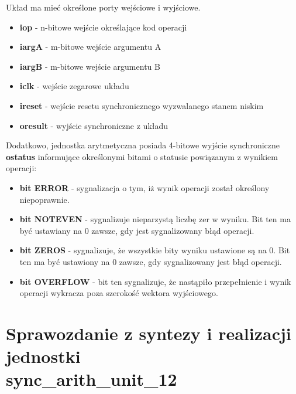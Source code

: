 \documentclass[12pt]{article}
\begin{document}
Układ ma mieć określone porty wejściowe i wyjściowe.
\begin{itemize}
  \item \textbf{i\textunderscore op} - n-bitowe wejście określające kod operacji
  \item \textbf{i\textunderscore arg\textunderscore A} - m-bitowe wejście argumentu A
  \item \textbf{i\textunderscore arg\textunderscore B} - m-bitowe wejście argumentu B
  \item \textbf{i\textunderscore clk} - wejście zegarowe układu
  \item \textbf{i\textunderscore reset} - wejście resetu synchronicznego wyzwalanego stanem niskim
  \item \textbf{o\textunderscore result} - wyjście synchroniczne z układu
\end{itemize}
Dodatkowo, jednostka arytmetyczna posiada 4-bitowe wyjście   synchroniczne \textbf{o\textunderscore status}
informujące określonymi bitami o statusie powiązanym z wynikiem operacji:

\begin{itemize}
  \item \textbf{bit ERROR} - sygnalizacja o tym, iż wynik operacji został określony niepoprawnie.
  \item \textbf{bit NOT\textunderscore  EVEN} - sygnalizuje nieparzystą liczbę zer w wyniku.
  Bit ten ma być ustawiany na 0 zawsze, gdy jest sygnalizowany błąd operacji.
  \item \textbf{bit ZEROS} - sygnalizuje, że wszystkie bity wyniku ustawione są na 0. Bit ten ma być
  ustawiony na 0 zawsze, gdy sygnalizowany jest błąd operacji.
  \item \textbf{bit OVERFLOW} - bit ten sygnalizuje, że nastąpiło przepełnienie i wynik 
  operacji wykracza poza szerokość wektora wyjściowego.
\end{itemize}

\section{Sprawozdanie z syntezy i realizacji jednostki 
\\ \textbf{sync\_arith\_unit\_12} }

\subsection{}
\end{document}
